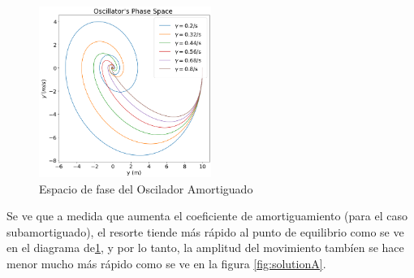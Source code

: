 \documentclass[a4paper]{article}
\theoremstyle{definition}
\theoremstyle{plain}
\begin{document}
\begin{figure}[H]
\begin {center}
\includegraphics[width=0.5\textwidth]{output_2_1.png}
\caption{Espacio de fase del Oscilador Amortiguado}
\label{fig:PhaseA}
\end {center}
\end{figure}

Se ve que a medida que aumenta el coeficiente de amortiguamiento (para el caso subamortiguado), el resorte tiende más rápido al punto de equilibrio como se ve en el diagrama de\ref{fig:PhaseA}, y por lo tanto, la amplitud del movimiento tambíen se hace menor mucho más rápido como se ve en la figura \ref{fig:solutionA}.
\end{document}

